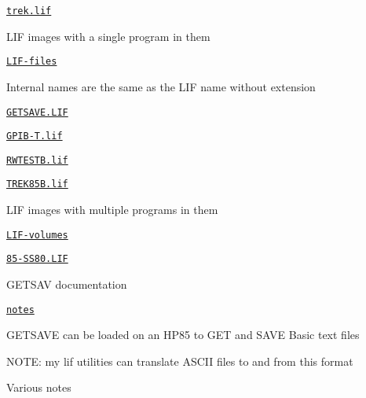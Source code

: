 \begin{DoxyItemize}
\begin{DoxyItemize}
\begin{DoxyItemize}
\begin{DoxyItemize}
\begin{DoxyItemize}
\begin{DoxyItemize}
\item \href{sdcard/TREK85/trek.lif}{\tt trek.\+lif}
\end{DoxyItemize}
\end{DoxyItemize}
\end{DoxyItemize}
\item L\+IF images with a single program in them
\begin{DoxyItemize}
\item \href{sdcard/LIF-files}{\tt L\+I\+F-\/files}
\begin{DoxyItemize}
\item Internal names are the same as the L\+IF name without extension
\end{DoxyItemize}
\item \href{sdcard/ASCII-files/GETSAVE.LIF}{\tt G\+E\+T\+S\+A\+V\+E.\+L\+IF}
\item \href{sdcard/ASCII-files/GPIB-T.lif}{\tt G\+P\+I\+B-\/\+T.\+lif}
\item \href{sdcard/ASCII-files/RWTESTB.lif}{\tt R\+W\+T\+E\+S\+T\+B.\+lif}
\item \href{sdcard/ASCII-files/TREK85B.lif}{\tt T\+R\+E\+K85\+B.\+lif}
\end{DoxyItemize}
\item L\+IF images with multiple programs in them
\begin{DoxyItemize}
\item \href{sdcard/LIF-volumes}{\tt L\+I\+F-\/volumes}
\begin{DoxyItemize}
\item \href{sdcard/ASCII-files/85-SS80.LIF}{\tt 85-\/\+S\+S80.\+L\+IF}
\end{DoxyItemize}
\end{DoxyItemize}
\item G\+E\+T\+S\+AV documentation
\begin{DoxyItemize}
\item \href{sdcard/notes}{\tt notes}
\begin{DoxyItemize}
\item G\+E\+T\+S\+A\+VE can be loaded on an H\+P85 to G\+ET and S\+A\+VE Basic text files
\begin{DoxyItemize}
\item N\+O\+TE\+: my lif utilities can translate A\+S\+C\+II files to and from this format
\end{DoxyItemize}
\end{DoxyItemize}
\item Various notes 

 
\end{DoxyItemize}
\end{DoxyItemize}
\end{DoxyItemize}
\end{DoxyItemize}